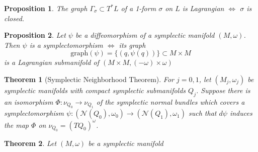 \documentclass{article}
\newtheorem{thm}{Theorem}
\newtheorem{prop}{Proposition}
\begin{document}
\begin{prop}
The graph $\Gamma_{\sigma} \subset T^*L$ of a 1-form $\sigma$ on $L$ is Lagrangian $\iff$ $\sigma$ is closed.
\end{prop}

\begin{prop}
Let $\psi$ be a diffeomorphism of a symplectic manifold $(M,\omega)$. Then $\psi$ is a symplectomorphism $\iff$ its graph
\begin{equation}
    \mathrm{graph}(\psi)=\{(q,\psi(q))\} \subset M \times M
\end{equation}
is a Lagrangian submanifold of $(M \times M, (-\omega) \times \omega)$
\end{prop}

\begin{thm}[Symplectic Neighborhood Theorem]
For $j=0,1$, let $(M_j,\omega_j)$ be symplectic manifolds with compact symplectic submanifolds $Q_j$. Suppose there is an isomorphism $\Phi: \nu_{Q_0} \to \nu_{Q_1}$ of the symplectic normal bundles which covers a symplectomorphism $\psi:(\mathcal{N}(Q_0),\omega_0) \to (\mathcal{N}(Q_1),\omega_1)$ such that $d\psi$ induces the map $\Phi$ on $\nu_{Q_0}=(TQ_0)^{\omega}$.
\end{thm}

\begin{thm}
Let $(M,\omega)$  be a symplectic manifold
\end{thm}
\end{document}
